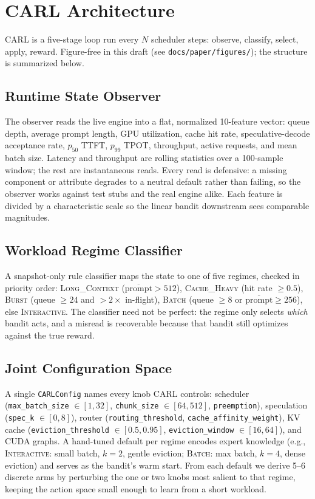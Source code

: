 \documentclass[10pt,twocolumn]{article}
\begin{document}
\section{CARL Architecture}
\label{sec:arch}

CARL is a five-stage loop run every $N$ scheduler steps: observe, classify,
select, apply, reward. Figure-free in this draft (see
\texttt{docs/paper/figures/}); the structure is summarized below.

\subsection{Runtime State Observer}
\label{sec:state}

The observer reads the live engine into a flat, normalized 10-feature vector:
queue depth, average prompt length, GPU utilization, cache hit rate,
speculative-decode acceptance rate, $p_{50}$ TTFT, $p_{99}$ TPOT, throughput,
active requests, and mean batch size. Latency and throughput are rolling
statistics over a 100-sample window; the rest are instantaneous reads. Every
read is defensive: a missing component or attribute degrades to a neutral
default rather than failing, so the observer works against test stubs and the
real engine alike. Each feature is divided by a characteristic scale so the
linear bandit downstream sees comparable magnitudes.

\subsection{Workload Regime Classifier}
\label{sec:regime}

A snapshot-only rule classifier maps the state to one of five regimes, checked
in priority order: \textsc{Long\_Context} ($\overline{\text{prompt}} > 512$),
\textsc{Cache\_Heavy} (hit rate $\geq 0.5$), \textsc{Burst} (queue $\geq 24$ and
$> 2\times$ in-flight), \textsc{Batch} (queue $\geq 8$ or
$\overline{\text{prompt}} \geq 256$), else \textsc{Interactive}. The classifier
need not be perfect: the regime only selects \emph{which} bandit acts, and a
misread is recoverable because that bandit still optimizes against the true
reward.

\subsection{Joint Configuration Space}
\label{sec:config}

A single \texttt{CARLConfig} names every knob CARL controls: scheduler
(\texttt{max\_batch\_size} $\in[1,32]$, \texttt{chunk\_size} $\in[64,512]$,
\texttt{preemption}), speculation (\texttt{spec\_k} $\in[0,8]$), router
(\texttt{routing\_threshold}, \texttt{cache\_affinity\_weight}), KV cache
(\texttt{eviction\_threshold} $\in[0.5,0.95]$, \texttt{eviction\_window}
$\in[16,64]$), and CUDA graphs. A hand-tuned default per regime encodes expert
knowledge (e.g., \textsc{Interactive}: small batch, $k{=}2$, gentle eviction;
\textsc{Batch}: max batch, $k{=}4$, dense eviction) and serves as the bandit's
warm start. From each default we derive 5--6 discrete arms by perturbing the one
or two knobs most salient to that regime, keeping the action space small enough
to learn from a short workload.
\end{document}

